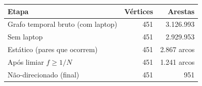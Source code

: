 \begin{tabular}{lrr}
  \toprule
  Etapa & Vértices & Arestas \\
  \midrule
  Grafo temporal bruto (com laptop) & 451 & 3.126.993 \\
  Sem laptop & 451 & 2.929.953 \\
  Estático (pares que ocorrem) & 451 & 2.867 arcos \\
  Após limiar $f \geq 1/N$ & 451 & 1.241 arcos \\
  Não-direcionado (final) & 451 & 951 \\
  \bottomrule
\end{tabular}
